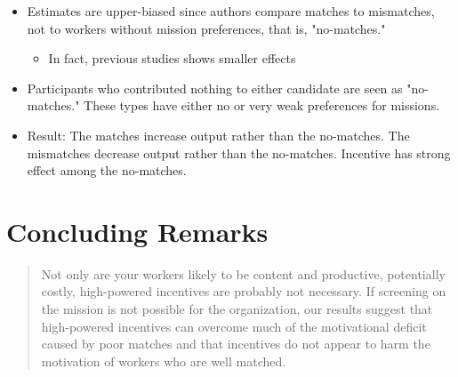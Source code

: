\documentclass[../root]{subfiles}
\begin{document}
    \begin{itemize}
        \item Estimates are upper-biased since authors compare matches to mismatches, not to workers without mission preferences, that is, "no-matches."
        \begin{itemize}
            \item In fact, previous studies shows smaller effects 
        \end{itemize}
        \item Participants who contributed nothing to either candidate are seen as "no-matches." These types have either no or very weak preferences for missions.
        \item Result: The matches increase output rather than the no-matches. The mismatches decrease output rather than the no-matches. Incentive has strong effect among the no-matches.
    \end{itemize}

    \section{Concluding Remarks}

    \begin{quote}
        Not only are your workers likely to be content and productive, potentially costly, high-powered incentives are probably not necessary. If screening on the mission is not possible for the organization, our results suggest that high-powered incentives can overcome much of the motivational deficit caused by poor matches and that incentives do not appear to harm the motivation of workers who are well matched.
    \end{quote}



    \biblio
\end{document}

